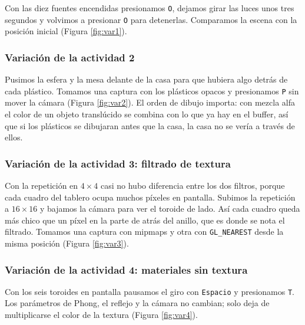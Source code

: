Con las diez fuentes encendidas presionamos \texttt{O}, dejamos girar las luces unos tres segundos y volvimos a presionar \texttt{O} para detenerlas. Comparamos la escena con la posición inicial (Figura \ref{fig:var1}).
\subsubsection{Variación de la actividad 2}

Pusimos la esfera y la mesa delante de la casa para que hubiera algo detrás de cada plástico. Tomamos una captura con los plásticos opacos y presionamos \texttt{P} sin mover la cámara (Figura \ref{fig:var2}). El orden de dibujo importa: con mezcla alfa el color de un objeto translúcido se combina con lo que ya hay en el buffer, así que si los plásticos se dibujaran antes que la casa, la casa no se vería a través de ellos.

\subsubsection{Variación de la actividad 3: filtrado de textura}

Con la repetición en $4\times4$ casi no hubo diferencia entre los dos filtros, porque cada cuadro del tablero ocupa muchos píxeles en pantalla. Subimos la repetición a $16\times16$ y bajamos la cámara para ver el toroide de lado. Así cada cuadro queda más chico que un píxel en la parte de atrás del anillo, que es donde se nota el filtrado. Tomamos una captura con mipmaps y otra con \texttt{GL\_NEAREST} desde la misma posición (Figura \ref{fig:var3}).

\subsubsection{Variación de la actividad 4: materiales sin textura}

Con los seis toroides en pantalla pausamos el giro con \texttt{Espacio} y presionamos \texttt{T}. Los parámetros de Phong, el reflejo y la cámara no cambian; solo deja de multiplicarse el color de la textura (Figura \ref{fig:var4}).
